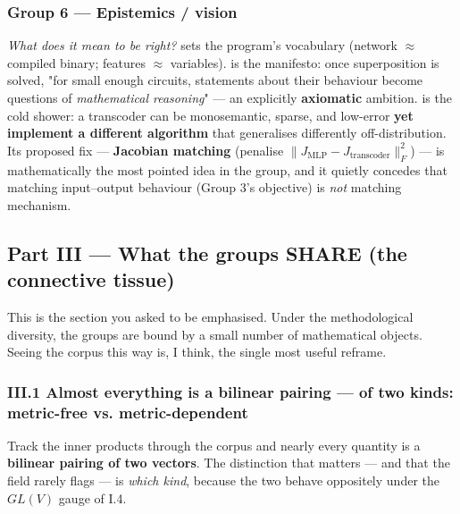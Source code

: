 \subsubsection*{Group 6 --- Epistemics / vision}
\emph{What does it mean to be right?} \textcite{mech-interp-variables-bases} sets the program's vocabulary (network $\approx$ compiled binary; features $\approx$ variables). \textcite{interpretability-dreams} is the manifesto: once superposition is solved, "for small enough circuits, statements about their behaviour become questions of \emph{mathematical reasoning}" --- an explicitly \textbf{axiomatic} ambition. \textcite{toy-model-of-mechanistic-unfaithfulness} is the cold shower: a transcoder can be monosemantic, sparse, and low-error \textbf{yet implement a different algorithm} that generalises differently off-distribution. Its proposed fix --- \textbf{Jacobian matching} (penalise $\|J_{\text{MLP}}-J_{\text{transcoder}}\|_F^2$) --- is mathematically the most pointed idea in the group, and it quietly concedes that matching input--output behaviour (Group 3's objective) is \emph{not} matching mechanism.



\subsection*{Part III --- What the groups SHARE (the connective tissue)}

This is the section you asked to be emphasised. Under the methodological diversity, the groups are bound by a small number of mathematical objects. Seeing the corpus this way is, I think, the single most useful reframe.


\subsubsection*{III.1 Almost everything is a bilinear pairing --- of two kinds: metric-free vs. metric-dependent}

Track the inner products through the corpus and nearly every quantity is a \textbf{bilinear pairing of two vectors}. The distinction that matters --- and that the field rarely flags --- is \emph{which kind}, because the two behave oppositely under the $GL(V)$ gauge of I.4.


